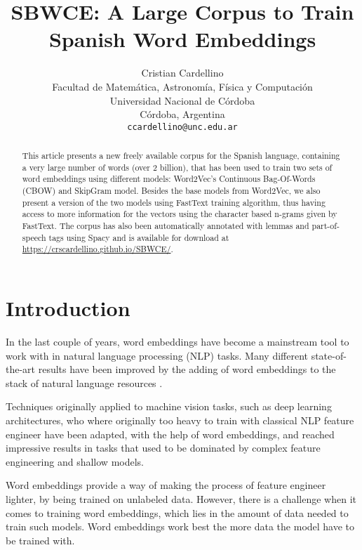 \documentclass{article}
\title{SBWCE: A Large Corpus to Train Spanish Word Embeddings}
\author{
  Cristian Cardellino \\
  Facultad de Matem\'atica, Astronom\'ia, F\'isica y Computaci\'on \\
  Universidad Nacional de C\'ordoba \\
  C\'ordoba, Argentina \\
  \texttt{ccardellino@unc.edu.ar} \\
}
\date{}
\begin{document}
\maketitle

\begin{abstract}
  This article presents a new freely available corpus for the Spanish language, containing
  a very large number of words (over 2 billion), that has been used to train two sets of
  word embeddings using different models: Word2Vec's \cite{DBLP:journals/corr/abs-1301-3781} 
  Continuous Bag-Of-Words (CBOW) and SkipGram model. Besides the base models from Word2Vec, 
  we also present a version of the two models using FastText \cite{rehurek_lrec} training algorithm, 
  thus having access to more information for the vectors using the character based n-grams given by 
  FastText. The corpus has also been automatically annotated with lemmas and part-of-speech tags using 
  Spacy \cite{spacy2} and is available for download at \url{https://crscardellino.github.io/SBWCE/}.
\end{abstract}




\section{Introduction}

In the last couple of years, word embeddings have become a mainstream tool to work with in
natural language processing (NLP) tasks. Many different state-of-the-art results have been improved
by the adding of word embeddings to the stack of natural language resources \cite{Collobert:2011:NLP:1953048.2078186}.

Techniques originally applied to machine vision tasks, such as deep learning architectures, who
where originally too heavy to train with classical NLP feature engineer have been adapted, with
the help of word embeddings, and reached impressive results in tasks that used to be dominated
by complex feature engineering and shallow models.

Word embeddings provide a way of making the process of feature engineer lighter, by being trained
on unlabeled data. However, there is a challenge when it comes to training word embeddings, which 
lies in the amount of data needed to train such models. Word embeddings work best the more data
the model have to be trained with.
\end{document}
